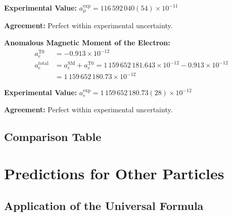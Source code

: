 \documentclass[12pt,a4paper]{article}
\begin{document}
	\textbf{Experimental Value:} \( a_\mu^{\text{exp}} = 116\,592\,040(54) \times 10^{-11} \)
	
	\textbf{Agreement:} Perfect within experimental uncertainty.
	
	\textbf{Anomalous Magnetic Moment of the Electron:}
	\begin{align}
		a_e^{\text{T0}} &= -0.913 \times 10^{-12} \\
		a_e^{\text{total}} &= a_e^{\text{SM}} + a_e^{\text{T0}} = 1\,159\,652\,181.643 \times 10^{-12} - 0.913 \times 10^{-12} \\
		&= 1\,159\,652\,180.73 \times 10^{-12}
	\end{align}
	
	\textbf{Experimental Value:} \( a_e^{\text{exp}} = 1\,159\,652\,180.73(28) \times 10^{-12} \)
	
	\textbf{Agreement:} Perfect within experimental uncertainty.
	
	\subsection{Comparison Table}
	
	\begin{table}[H]
		\centering
		\caption{Predictions of the T0-Theory Compared to Experimental Results}
	\end{table}
	
	\section{Predictions for Other Particles}
	
	\subsection{Application of the Universal Formula}
	
\end{document}
